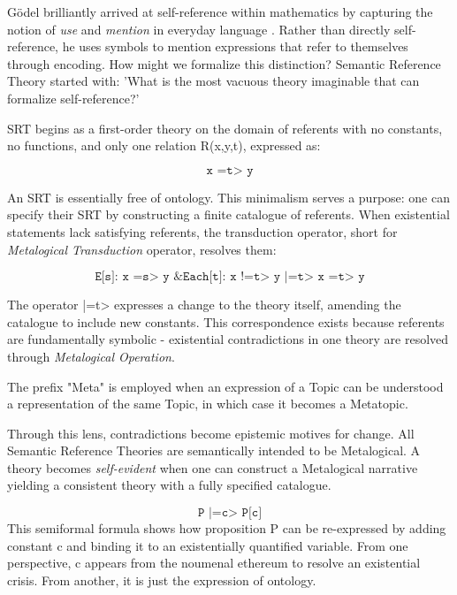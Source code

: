 \documentclass[runningheads]{llncs}
\begin{document}
Gödel brilliantly arrived at self-reference within mathematics by capturing the notion of \emph{use} and \emph{mention} in everyday language \cite{Quine1940}. Rather than directly self-reference, he uses symbols to mention expressions that refer to themselves through encoding. How might we formalize this distinction? Semantic Reference Theory started with: 'What is the most vacuous theory imaginable that can formalize self-reference?'

SRT begins as a first-order theory on the domain of referents with no constants, no functions, and only one relation R(x,y,t), expressed as:

$$\texttt{x =t> y}$$

An SRT is essentially free of ontology. This minimalism serves a purpose: one can specify their SRT by constructing a finite catalogue of referents. When existential statements lack satisfying referents, the transduction operator, short for \emph{Metalogical Transduction} operator, resolves them:

$$\texttt{E[s]: x =s> y \& Each[t]: x !=t> y |=t> x =t> y}$$

The operator |=t> expresses a change to the theory itself, amending the catalogue to include new constants. This correspondence exists because referents are fundamentally symbolic - existential contradictions in one theory are resolved through \emph{Metalogical Operation}.

\begin{assertion}
The prefix "Meta" is employed when an expression of a {Topic} can be understood a representation of the same {Topic}, in which case it becomes a Meta{topic}.
\end{assertion}

Through this lens, contradictions become epistemic motives for change. All Semantic Reference Theories are semantically intended to be Metalogical. A theory becomes \emph{self-evident} when one can construct a Metalogical narrative yielding a consistent theory with a fully specified catalogue.

$$\texttt{P |=c> P[c]}$$
This semiformal formula shows how proposition P can be re-expressed by adding constant c and binding it to an existentially quantified variable. From one perspective, c appears from the noumenal ethereum to resolve an existential crisis. From another, it is just the expression of ontology.
\end{document}
